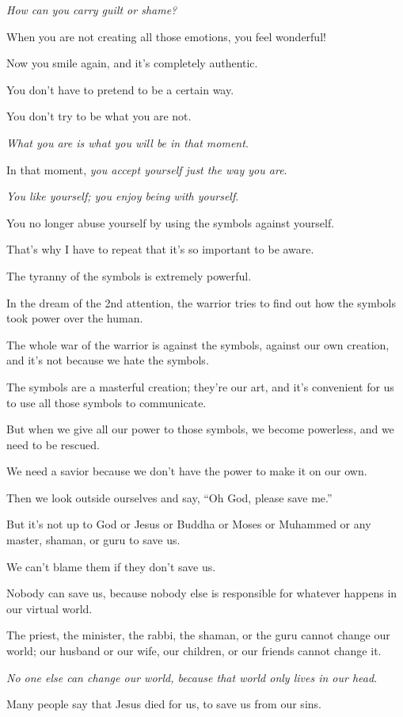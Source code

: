 \documentclass{article}
\numberwithin{equation}{section}
\begin{document}
\textit{How can you carry guilt or shame?}

When you are not creating all those emotions, you feel wonderful!

Now you smile again, and it's completely authentic.

You don't have to pretend to be a certain way.

You don't try to be what you are not.

\textit{What you are is what you will be in that moment}.

In that moment, \textit{you accept yourself just the way you are}.

\textit{You like yourself; you enjoy being with yourself}.

You no longer abuse yourself by using the symbols against yourself.

%
That's why I have to repeat that it's so important to be aware.

The tyranny of the symbols is extremely powerful.

In the dream of the 2nd attention, the warrior tries to find out how the symbols took power over the human.

The whole war of the warrior is against the symbols, against our own creation, and it's not because we hate the symbols.

The symbols are a masterful creation; they're our art, and it's convenient for us to use all those symbols to communicate.

But when we give all our power to those symbols, we become powerless, and we need to be rescued.

We need a savior because we don't have the power to make it on our own.

%
Then we look outside ourselves and say, ``Oh God, please save me.''

But it's not up to God or Jesus or Buddha or Moses or Muhammed or any master, shaman, or guru to save us.

We can't blame them if they don't save us.

Nobody can save us, because nobody else is responsible for whatever happens in our virtual world.

The priest, the minister, the rabbi, the shaman, or the guru cannot change our world; our husband or our wife, our children, or our friends cannot change it.

\textit{No one else can change our world, because that world only lives in our head}.

%
Many people say that Jesus died for us, to save us from our sins.
\end{document}
